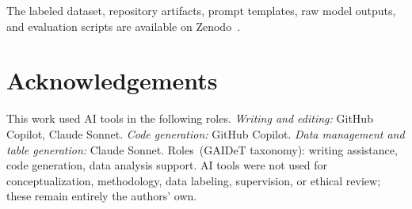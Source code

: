 \documentclass[runningheads]{llncs}
\begin{document}
The labeled dataset, repository artifacts, prompt templates, raw model outputs, and evaluation scripts are available on Zenodo~\cite{chertkov_2026_20051151}.

\section*{Acknowledgements}

This work used AI tools in the following roles. \textit{Writing and editing:} GitHub Copilot, Claude Sonnet. \textit{Code generation:} GitHub Copilot. \textit{Data management and table generation:} Claude Sonnet. Roles~(GAIDeT taxonomy): writing assistance, code generation, data
analysis support. AI tools were not used for conceptualization, methodology, data labeling, supervision, or ethical review; these remain entirely the authors' own.



\end{document}
